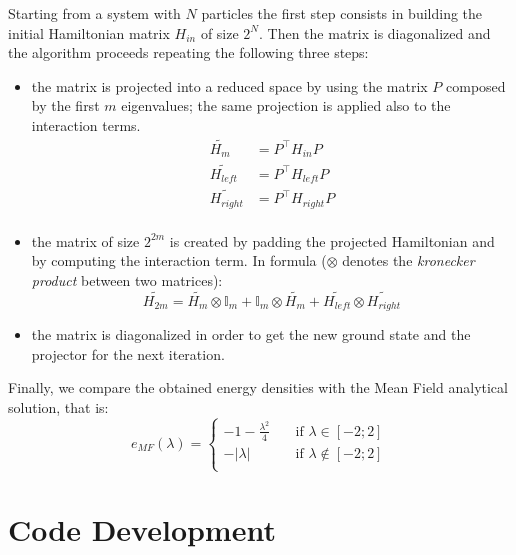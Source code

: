 \documentclass[11pt,a4paper]{article}
\begin{document}
Starting from a system with $N$ particles the first step consists in building the initial Hamiltonian matrix $H_{in}$ of size $2^N$. Then the matrix is diagonalized and the algorithm proceeds repeating the following three steps:
\begin{itemize}
	\item the matrix is projected into a reduced space by using the matrix $P$ composed by the first $m$ eigenvalues; the same projection is applied also to the interaction terms.
	\begin{equation} \label{eq:proj}
	\begin{aligned}
		\widetilde{H_m} &= P^\intercal H_{in} P \\
		\widetilde{H_{left}} &= P^\intercal H_{left} P \\
		\widetilde{H_{right}} &= P^\intercal H_{right} P \\
	\end{aligned}	
	\end{equation} 
	\item the matrix of size $2^{2m}$ is created by padding the projected Hamiltonian and by computing the interaction term. In formula ($\otimes$ denotes the \textit{kronecker product} between two matrices):
	\begin{equation}
		\widetilde{H_{2m}} = \widetilde{H_m} \otimes \mathbb{I}_m + \mathbb{I}_m \otimes \widetilde{H_m} + \widetilde{H_{left}} \otimes \widetilde{H_{right}}
		\label{eq:doubleham}
	\end{equation}
	\item the matrix is diagonalized in order to get the new ground state and the projector for the next iteration.
\end{itemize}

Finally, we compare the obtained energy densities with the Mean Field analytical solution, that is:
\begin{equation}
	e_{MF}(\lambda) = 
	\begin{cases}
		-1 - \frac{\lambda^2}{4} & \quad \mbox{if } \lambda \in [-2;2] \\
		-|\lambda|               & \quad \mbox{if } \lambda \notin [-2;2] \\
	\end{cases}
\end{equation}


\section{Code Development} %
\end{document}
